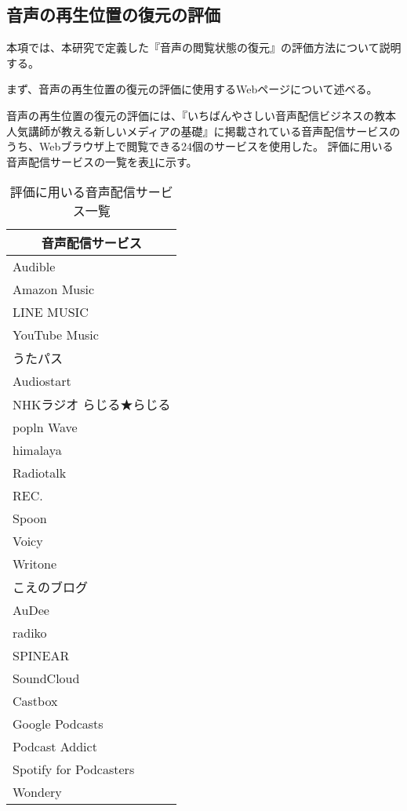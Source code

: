 \subsection{音声の再生位置の復元の評価}
本項では、本研究で定義した『音声の閲覧状態の復元』の評価方法について説明する。

まず、音声の再生位置の復元の評価に使用するWebページについて述べる。

音声の再生位置の復元の評価には、『いちばんやさしい音声配信ビジネスの教本 人気講師が教える新しいメディアの基礎』\cite{easiest-audio-buisiness-book}に掲載されている音声配信サービスのうち、Webブラウザ上で閲覧できる24個のサービスを使用した。
評価に用いる音声配信サービスの一覧を表\ref{tb:evl-audio-service-list}に示す。

\begin{table}[htbp]
  \label{tb:evl-audio-service-list}
  \caption{評価に用いる音声配信サービス一覧}
  \begin{center}
    \begin{tabular}{|l|}
    \hline
    \multicolumn{1}{|c|}{\textbf{音声配信サービス}} \\\hline
    Audible \\ \hline
    Amazon Music \\ \hline
    LINE MUSIC \\ \hline
    YouTube Music \\ \hline
    うたパス \\ \hline
    Audiostart \\ \hline
    NHKラジオ らじる★らじる \\ \hline
    popln Wave \\ \hline
    himalaya \\ \hline
    Radiotalk \\ \hline
    REC. \\ \hline
    Spoon \\ \hline
    Voicy \\ \hline
    Writone \\ \hline
    こえのブログ \\ \hline
    AuDee \\ \hline
    radiko \\ \hline
    SPINEAR \\ \hline
    SoundCloud \\ \hline
    Castbox \\ \hline
    Google Podcasts \\ \hline
    Podcast Addict \\ \hline
    Spotify for Podcasters \\ \hline
    Wondery \\ \hline
    \end{tabular}
  \end{center}
\end{table}

